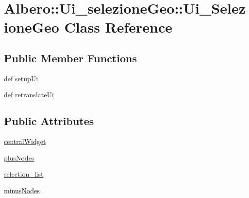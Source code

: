 \hypertarget{classAlbero_1_1Ui__selezioneGeo_1_1Ui__SelezioneGeo}{
\section{Albero::Ui\_\-selezioneGeo::Ui\_\-SelezioneGeo Class Reference}
\label{classAlbero_1_1Ui__selezioneGeo_1_1Ui__SelezioneGeo}
}
\subsection*{Public Member Functions}
\begin{DoxyCompactItemize}
\item 
def \hyperlink{classAlbero_1_1Ui__selezioneGeo_1_1Ui__SelezioneGeo_a4e0a023571eee3e7562ad40d63bb1cf4}{setupUi}
\item 
def \hyperlink{classAlbero_1_1Ui__selezioneGeo_1_1Ui__SelezioneGeo_a482426c3d0e8259d7bc1c0a83ab45b9e}{retranslateUi}
\end{DoxyCompactItemize}
\subsection*{Public Attributes}
\begin{DoxyCompactItemize}
\item 
\hyperlink{classAlbero_1_1Ui__selezioneGeo_1_1Ui__SelezioneGeo_adc568785ac70284caf9d70c468913801}{centralWidget}
\item 
\hyperlink{classAlbero_1_1Ui__selezioneGeo_1_1Ui__SelezioneGeo_ad541bc7c14f44f24da9d389e7f9fbb11}{plusNodes}
\item 
\hyperlink{classAlbero_1_1Ui__selezioneGeo_1_1Ui__SelezioneGeo_aac5a7bb91b80dcb65bb38724bd9652d4}{selection\_\-list}
\item 
\hyperlink{classAlbero_1_1Ui__selezioneGeo_1_1Ui__SelezioneGeo_abe0346dce771ee2e0fbe47e682e18ef1}{minusNodes}
\end{DoxyCompactItemize}


